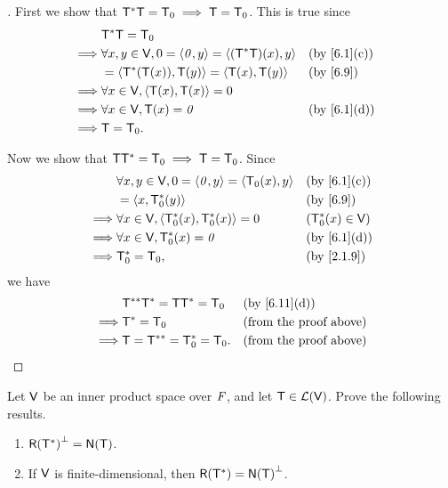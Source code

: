 \begin{proof}[]
	First we show that \(\mathsf{T}^* \mathsf{T} = \mathsf{T}_0 \implies \mathsf{T} = \mathsf{T}_0\).
	This is true since
	\begin{align*}
		         & \T^* \T = \zT                                                                  \\
		\implies & \forall x, y \in \V, 0 = \inn{\zv, y} = \inn{(\T^* \T)(x), y} &  & \by{6.1}[c] \\
		         & = \inn{\T^*(\T(x)), \T(y)} = \inn{\T(x), \T(y)}               &  & \by{6.9}    \\
		\implies & \forall x \in \V, \inn{\T(x), \T(x)} = 0                                       \\
		\implies & \forall x \in \V, \T(x) = \zv                                 &  & \by{6.1}[d] \\
		\implies & \T = \zT.
	\end{align*}

	Now we show that \(\mathsf{T} \mathsf{T}^* = \mathsf{T}_0 \implies \mathsf{T} = \mathsf{T}_0\).
	Since
	\begin{align*}
		         & \forall x, y \in \V, 0 = \inn{\zv, y} = \inn{\zT(x), y} &  & \by{6.1}[c]       \\
		         & = \inn{x, \zT^*(y)}                                     &  & \by{6.9}          \\
		\implies & \forall x \in \V, \inn{\zT^*(x), \zT^*(x)} = 0          &  & (\zT^*(x) \in \V) \\
		\implies & \forall x \in \V, \zT^*(x) = \zv                        &  & \by{6.1}[d]       \\
		\implies & \zT^* = \zT,                                            &  & \by{2.1.9}
	\end{align*}
	we have
	\begin{align*}
		         & \T^{**} \T^* = \T \T^* = \zT &  & \by{6.11}[d]                  \\
		\implies & \T^* = \zT                   &  & \text{(from the proof above)} \\
		\implies & \T = \T^{**} = \zT^* = \zT.  &  & \text{(from the proof above)}
	\end{align*}
\end{proof}

\begin{ex}\label{ex:6.3.12}
	Let \(\mathsf{V}\) be an inner product space over \(\mathit{F}\), and let \(\mathsf{T} \in \mathcal{L}(\mathsf{V})\).
	Prove the following results.
	\begin{enumerate}
		\item \(\rg{\T^*}^{\perp} = \ns{\T}\).
		\item If \(\mathsf{V}\) is finite-dimensional, then \(\rg{\T^*} = \ns{\T}^{\perp}\).
	\end{enumerate}
\end{ex}

